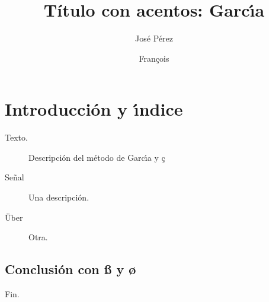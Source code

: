 \documentclass{article}
\title{T\'itulo con acentos: Garc\'{\i}a}
\author{Jos\'e P\'erez \and Fran\c{c}ois}
\begin{document}
\maketitle
\tableofcontents
\section{Introducci\'on y \'{\i}ndice}\label{s}
Texto.
\begin{figure}[h]
\caption{Descripci\'on del m\'etodo de Garc\'{\i}a y \c{c}}\label{f}
\end{figure}
\begin{description}
\item[Se\~nal] Una descripci\'on.
\item[\"Uber] Otra.
\end{description}
\subsection{Conclusi\'on con \ss{} y \o}
Fin.
\end{document}
